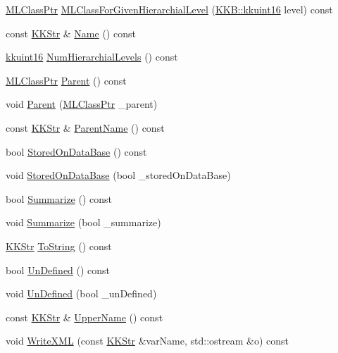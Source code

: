\begin{DoxyCompactItemize}
\item 
\hyperlink{namespace_k_k_m_l_l_ac272393853d59e72e8456f14cd6d8c23}{M\+L\+Class\+Ptr} \hyperlink{class_k_k_m_l_l_1_1_m_l_class_a739ec0353640c9a40e3a5aea30f8915d}{M\+L\+Class\+For\+Given\+Hierarchial\+Level} (\hyperlink{namespace_k_k_b_aa8c7d4d30381c8a0b6fce68974a9c8a9}{K\+K\+B\+::kkuint16} level) const 
\item 
const \hyperlink{class_k_k_b_1_1_k_k_str}{K\+K\+Str} \& \hyperlink{class_k_k_m_l_l_1_1_m_l_class_afa9ddc8ac44c314301800e89e3d3478e}{Name} () const 
\item 
\hyperlink{namespace_k_k_b_aa8c7d4d30381c8a0b6fce68974a9c8a9}{kkuint16} \hyperlink{class_k_k_m_l_l_1_1_m_l_class_a5b467c88005cee2164c72bbfb42ae46c}{Num\+Hierarchial\+Levels} () const 
\item 
\hyperlink{namespace_k_k_m_l_l_ac272393853d59e72e8456f14cd6d8c23}{M\+L\+Class\+Ptr} \hyperlink{class_k_k_m_l_l_1_1_m_l_class_a690ee6186141d55fef5cebd4360428e1}{Parent} () const 
\item 
void \hyperlink{class_k_k_m_l_l_1_1_m_l_class_adbe4c799f6698688ac0649b2096ef8cf}{Parent} (\hyperlink{namespace_k_k_m_l_l_ac272393853d59e72e8456f14cd6d8c23}{M\+L\+Class\+Ptr} \+\_\+parent)
\item 
const \hyperlink{class_k_k_b_1_1_k_k_str}{K\+K\+Str} \& \hyperlink{class_k_k_m_l_l_1_1_m_l_class_aed21d5a65dccb3d0ebd6289d55250d35}{Parent\+Name} () const 
\item 
bool \hyperlink{class_k_k_m_l_l_1_1_m_l_class_ac2a4ae4609c312c70354f4900d974298}{Stored\+On\+Data\+Base} () const 
\item 
void \hyperlink{class_k_k_m_l_l_1_1_m_l_class_af0b2ea52d24a9989a216adb8e2f22a1e}{Stored\+On\+Data\+Base} (bool \+\_\+stored\+On\+Data\+Base)
\item 
bool \hyperlink{class_k_k_m_l_l_1_1_m_l_class_a04b80dffade0855bf6bfe34a74ce004f}{Summarize} () const 
\item 
void \hyperlink{class_k_k_m_l_l_1_1_m_l_class_a65b162c1fa1f478ab10b3cc6a8332857}{Summarize} (bool \+\_\+summarize)
\item 
\hyperlink{class_k_k_b_1_1_k_k_str}{K\+K\+Str} \hyperlink{class_k_k_m_l_l_1_1_m_l_class_af7f30e5b205346aea3e524b1589a8bba}{To\+String} () const 
\item 
bool \hyperlink{class_k_k_m_l_l_1_1_m_l_class_add5b7120a94078e1dcd455ad1c103267}{Un\+Defined} () const 
\item 
void \hyperlink{class_k_k_m_l_l_1_1_m_l_class_a88020db82dda91938d0a06240e581df0}{Un\+Defined} (bool \+\_\+un\+Defined)
\item 
const \hyperlink{class_k_k_b_1_1_k_k_str}{K\+K\+Str} \& \hyperlink{class_k_k_m_l_l_1_1_m_l_class_a3e688259223abd20da71a18a9877fbc4}{Upper\+Name} () const 
\item 
void \hyperlink{class_k_k_m_l_l_1_1_m_l_class_a3ba7c0c32b973c8cd0231d7ef8f7e122}{Write\+X\+ML} (const \hyperlink{class_k_k_b_1_1_k_k_str}{K\+K\+Str} \&var\+Name, std\+::ostream \&o) const 
\end{DoxyCompactItemize}

